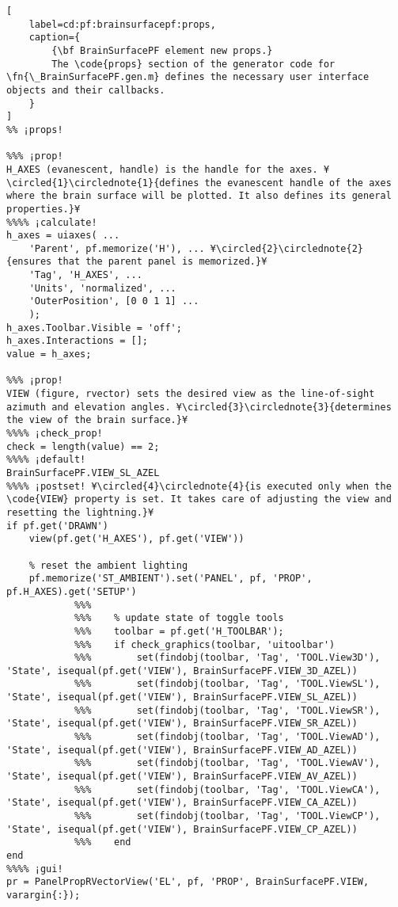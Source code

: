 \documentclass{tufte-handout}
\begin{document}
\begin{lstlisting}[
	label=cd:pf:brainsurfacepf:props,
	caption={
		{\bf BrainSurfacePF element new props.}
		The \code{props} section of the generator code for \fn{\_BrainSurfacePF.gen.m} defines the necessary user interface objects and their callbacks.
	}
]
%% ¡props!

%%% ¡prop!
H_AXES (evanescent, handle) is the handle for the axes. ¥\circled{1}\circlednote{1}{defines the evanescent handle of the axes where the brain surface will be plotted. It also defines its general properties.}¥
%%%% ¡calculate!
h_axes = uiaxes( ...
    'Parent', pf.memorize('H'), ... ¥\circled{2}\circlednote{2}{ensures that the parent panel is memorized.}¥
    'Tag', 'H_AXES', ...
    'Units', 'normalized', ...
    'OuterPosition', [0 0 1 1] ...
    );
h_axes.Toolbar.Visible = 'off';
h_axes.Interactions = [];
value = h_axes;

%%% ¡prop!
VIEW (figure, rvector) sets the desired view as the line-of-sight azimuth and elevation angles. ¥\circled{3}\circlednote{3}{determines the view of the brain surface.}¥
%%%% ¡check_prop!
check = length(value) == 2;
%%%% ¡default!
BrainSurfacePF.VIEW_SL_AZEL
%%%% ¡postset! ¥\circled{4}\circlednote{4}{is executed only when the \code{VIEW} property is set. It takes care of adjusting the view and resetting the lightning.}¥
if pf.get('DRAWN')
    view(pf.get('H_AXES'), pf.get('VIEW'))
    
    % reset the ambient lighting
    pf.memorize('ST_AMBIENT').set('PANEL', pf, 'PROP', pf.H_AXES).get('SETUP')
            %%%    
            %%%    % update state of toggle tools
            %%%    toolbar = pf.get('H_TOOLBAR');
            %%%    if check_graphics(toolbar, 'uitoolbar')
            %%%        set(findobj(toolbar, 'Tag', 'TOOL.View3D'), 'State', isequal(pf.get('VIEW'), BrainSurfacePF.VIEW_3D_AZEL))
            %%%        set(findobj(toolbar, 'Tag', 'TOOL.ViewSL'), 'State', isequal(pf.get('VIEW'), BrainSurfacePF.VIEW_SL_AZEL))
            %%%        set(findobj(toolbar, 'Tag', 'TOOL.ViewSR'), 'State', isequal(pf.get('VIEW'), BrainSurfacePF.VIEW_SR_AZEL))
            %%%        set(findobj(toolbar, 'Tag', 'TOOL.ViewAD'), 'State', isequal(pf.get('VIEW'), BrainSurfacePF.VIEW_AD_AZEL))
            %%%        set(findobj(toolbar, 'Tag', 'TOOL.ViewAV'), 'State', isequal(pf.get('VIEW'), BrainSurfacePF.VIEW_AV_AZEL))
            %%%        set(findobj(toolbar, 'Tag', 'TOOL.ViewCA'), 'State', isequal(pf.get('VIEW'), BrainSurfacePF.VIEW_CA_AZEL))
            %%%        set(findobj(toolbar, 'Tag', 'TOOL.ViewCP'), 'State', isequal(pf.get('VIEW'), BrainSurfacePF.VIEW_CP_AZEL))
            %%%    end
end
%%%% ¡gui!
pr = PanelPropRVectorView('EL', pf, 'PROP', BrainSurfacePF.VIEW, varargin{:});


\end{lstlisting}
\end{document}
